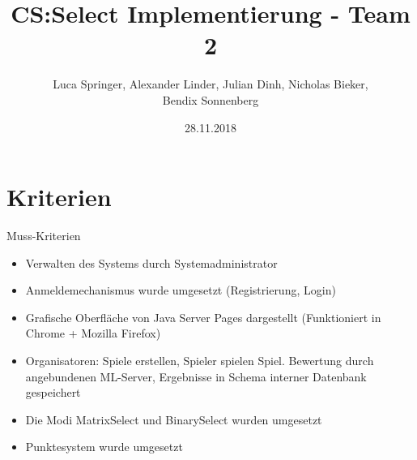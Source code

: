 \documentclass[xcolor=dvipsnames]{beamer}
\title[Team 2 - Implementierung]{CS:Select Implementierung - Team 2}
\author{Luca Springer, Alexander Linder, Julian Dinh, Nicholas Bieker,\\ Bendix Sonnenberg}
\date{28.11.2018}
\begin{document}
\begin{frame} %
  \titlepage
\end{frame}

\section{Kriterien}

\begin{frame}{Muss-Kriterien}
  \begin{itemize}
    \item Verwalten des Systems durch Systemadministrator \\
    \item Anmeldemechanismus wurde umgesetzt (Registrierung, Login) \\
    \item Grafische Oberfläche von Java Server Pages dargestellt (Funktioniert in Chrome + Mozilla Firefox) \\
    \item Organisatoren: Spiele erstellen, Spieler spielen Spiel. Bewertung durch angebundenen ML-Server, Ergebnisse in Schema interner Datenbank gespeichert \\
    \item Die Modi MatrixSelect und BinarySelect wurden umgesetzt \\
    \item Punktesystem wurde umgesetzt \\
  \end{itemize}
\end{frame}
\end{document}
